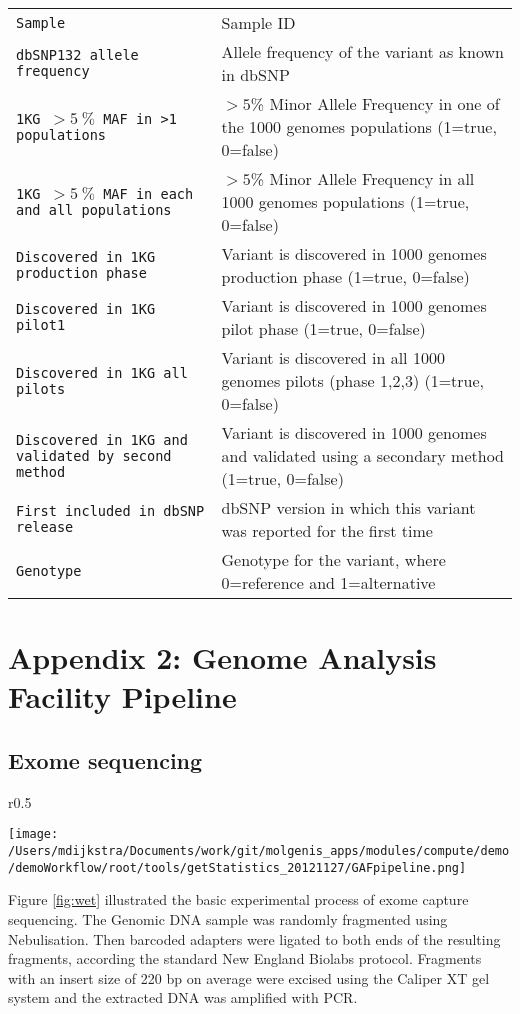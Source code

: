 \documentclass[a4paper,12pt]{article}
\begin{document}
\begin{center}
\begin{longtable}{p{5cm} p{8cm}}
	\tt{Sample} & Sample ID \\
	\tt{dbSNP132 allele frequency} & Allele frequency of the variant as known in dbSNP \\
	\tt{1KG $>5~\%$ MAF in >1 populations} & $>5$\% Minor Allele Frequency in one of the 1000 genomes populations (1=true, 0=false) \\
	\tt{1KG $>5~\%$ MAF in each and all populations} & $>5$\% Minor Allele Frequency in all 1000 genomes populations (1=true, 0=false) \\
	\tt{Discovered in 1KG production phase} & Variant is discovered in 1000 genomes production phase (1=true, 0=false) \\
	\tt{Discovered in 1KG pilot1} & Variant is discovered in 1000 genomes pilot phase (1=true, 0=false) \\
	\tt{Discovered in 1KG all pilots} & Variant is discovered in all 1000 genomes pilots (phase 1,2,3) (1=true, 0=false) \\
	\tt{Discovered in 1KG and validated by second method} & Variant is discovered in 1000 genomes and validated using a secondary method (1=true, 0=false) \\
	\tt{First included in dbSNP release} & dbSNP version in which this variant was reported for the first time \\
	\tt{Genotype} & Genotype for the variant, where 0=reference and 1=alternative \\	\end{longtable}
\end{center}

\clearpage
\section*{Appendix 2: Genome Analysis Facility Pipeline}
\subsection*{Exome sequencing}
\begin{wrapfigure}{r}{0.5\textwidth}
	\begin{center}
		\texttt{[image: /Users/mdijkstra/Documents/work/git/molgenis\_apps/modules/compute/demo/demoWorkflow/root/tools/getStatistics\_20121127/GAFpipeline.png]}
	\end{center}
	\caption{Workflow in the lab}
	\label{fig:wet}
\end{wrapfigure}
Figure \ref{fig:wet} illustrated the basic experimental process of exome capture sequencing. The Genomic DNA sample was randomly fragmented using Nebulisation. Then barcoded adapters were ligated to both ends of the resulting fragments, according the standard New England Biolabs protocol. Fragments with an insert size of 220 bp on average were excised using the Caliper XT gel system and the extracted DNA was amplified with PCR.
\end{document}
